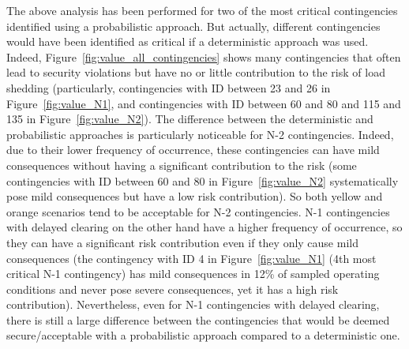 The above analysis has been performed for two of the most critical contingencies identified using a probabilistic approach. But actually, different contingencies would have been identified as critical if a deterministic approach was used. Indeed, Figure~\ref{fig:value_all_contingencies} shows many contingencies that often lead to security violations but have no or little contribution to the risk of load shedding (particularly, contingencies with ID between 23 and 26 in Figure~\ref{fig:value_N1}, and contingencies with ID between 60 and 80 and 115 and 135 in Figure~\ref{fig:value_N2}). The difference between the deterministic and probabilistic approaches is particularly noticeable for N-2 contingencies. Indeed, due to their lower frequency of occurrence, these contingencies can have mild consequences without having a significant contribution to the risk (\eg some contingencies with ID between 60 and 80 in Figure~\ref{fig:value_N2} systematically pose mild consequences but have a low risk contribution). So both yellow and orange scenarios tend to be acceptable for N-2 contingencies. N-1 contingencies with delayed clearing on the other hand have a higher frequency of occurrence, so they can have a significant risk contribution even if they only cause mild consequences (\eg the contingency with ID 4 in Figure~\ref{fig:value_N1} (4th most critical N-1 contingency) has mild consequences in 12\% of sampled operating conditions and never pose severe consequences, yet it has a high risk contribution). Nevertheless, even for N-1 contingencies with delayed clearing, there is still a large difference between the contingencies that would be deemed secure/acceptable with a probabilistic approach compared to a deterministic one.


